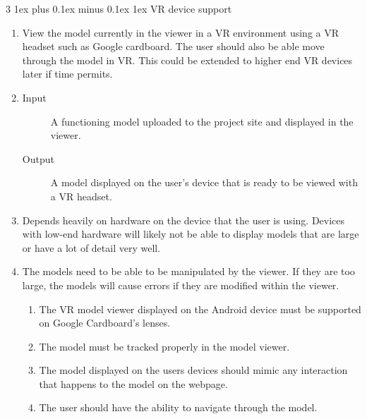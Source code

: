 \documentclass[letterpaper, 10pt, draftclsnofoot, compsoc, onecolumn]{IEEEtran}
\makeatletter
\def\subsubsection{\@startsection{subsubsection}%
                                 {3}%
                                 {\z@}%
                                 {1ex plus 0.1ex minus 0.1ex}%
                                 {1ex}%
                                 {\normalfont\normalsize}}%
\makeatother
\begin{document}
\subsubsection{VR device support}

\begin{enumerate}
	\item View the model currently in the viewer in a VR environment using a VR headset such as Google cardboard. The user should also
	be able move through the model in VR. This could be extended to higher end VR devices later if time permits.

	\item
	\begin{description}
		\item[Input] A functioning model uploaded to the project site and displayed in the viewer.
		\item[Output] A model displayed on the user's device that is ready to be viewed with a VR headset.
	\end{description}

	\item Depends heavily on hardware on the device that the user is using. Devices with low-end hardware will likely not be able to 
	display models that are large or have a lot of detail very well.  

	\item The models need to be able to be manipulated by the viewer. If they are too large, the models will cause errors if they are 
	modified within the viewer.  

	\begin{enumerate}
		\item The VR model viewer displayed on the Android device must be supported on Google Cardboard's lenses. 
		\item The model must be tracked properly in the model viewer. 
		\item The model displayed on the users devices should mimic any interaction that happens to the model on the webpage.
		\item The user should have the ability to navigate through the model. 
	\end{enumerate} 
\end{enumerate}
\end{document}
